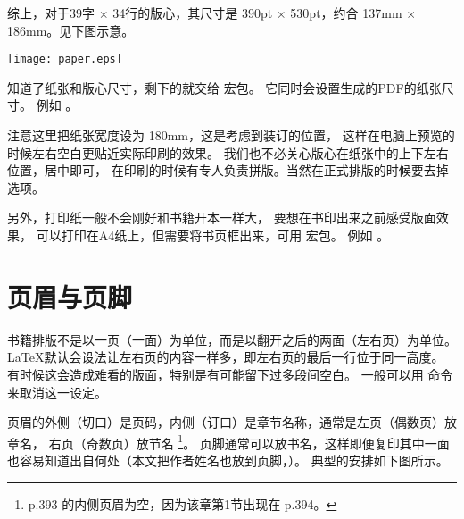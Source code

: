 综上，对于39字 $\times$ 34行的版心，其尺寸是 390pt $\times$ 530pt，约合 137mm $\times$ 186mm。见下图示意。

\centerline{\texttt{[image: paper.eps]}}

知道了纸张和版心尺寸，剩下的就交给  宏包。
它同时会设置生成的PDF的纸张尺寸。
例如 。

注意这里把纸张宽度设为 180mm，这是考虑到装订的位置，
这样在电脑上预览的时候左右空白更贴近实际印刷的效果。
我们也不必关心版心在纸张中的上下左右位置，居中即可，
在印刷的时候有专人负责拼版。当然在正式排版的时候要去掉  选项。

另外，打印纸一般不会刚好和书籍开本一样大，
要想在书印出来之前感受版面效果，
可以打印在A4纸上，但需要将书页框出来，可用  宏包。
例如 。

\section{页眉与页脚} %

书籍排版不是以一页（一面）为单位，而是以翻开之后的两面（左右页）为单位。
\LaTeX 默认会设法让左右页的内容一样多，即左右页的最后一行位于同一高度。
有时候这会造成难看的版面，特别是有可能留下过多段间空白。
一般可以用  命令来取消这一设定。

页眉的外侧（切口）是页码，内侧（订口）是章节名称，通常是左页（偶数页）放章名，
右页（奇数页）放节名
\footnote{\mybooktitle p.393 的内侧页眉为空，因为该章第1节出现在 p.394。}。
页脚通常可以放书名，这样即便复印其中一面也容易知道出自何处（本文把作者姓名也放到页脚，）。
典型的安排如下图所示。

\vspace{1ex}
\centerline{%
\quad{}}

